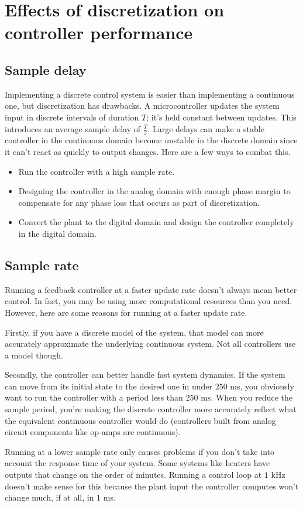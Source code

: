 \section{Effects of discretization on controller performance}

\subsection{Sample delay}

Implementing a discrete control system is easier than implementing a continuous
one, but \gls{discretization} has drawbacks. A microcontroller updates the
system input in discrete intervals of duration $T$; it's held constant between
updates. This introduces an average sample delay of $\frac{T}{2}$. Large delays
can make a stable controller in the continuous domain become unstable in the
discrete domain since it can't react as quickly to output changes. Here are a
few ways to combat this.
\begin{itemize}
  \item Run the controller with a high sample rate.
  \item Designing the controller in the analog domain with enough
    \gls{phase margin} to compensate for any phase loss that occurs as part of
    \gls{discretization}.
  \item Convert the \gls{plant} to the digital domain and design the controller
    completely in the digital domain.
\end{itemize}

\subsection{Sample rate}

Running a feedback controller at a faster update rate doesn't always mean better
control. In fact, you may be using more computational resources than you need.
However, here are some reasons for running at a faster update rate.

Firstly, if you have a discrete \gls{model} of the \gls{system}, that
\gls{model} can more accurately approximate the underlying continuous
\gls{system}. Not all controllers use a \gls{model} though.

Secondly, the controller can better handle fast \gls{system} dynamics. If the
\gls{system} can move from its initial state to the desired one in under $250$
ms, you obviously want to run the controller with a period less than $250$ ms.
When you reduce the sample period, you're making the discrete controller more
accurately reflect what the equivalent continuous controller would do
(controllers built from analog circuit components like op-amps are continuous).

Running at a lower sample rate only causes problems if you don't take into
account the response time of your \gls{system}. Some \glspl{system} like heaters
have \glspl{output} that change on the order of minutes. Running a control loop
at $1$ kHz doesn't make sense for this because the \gls{plant} \gls{input} the
controller computes won't change much, if at all, in $1$ ms.
